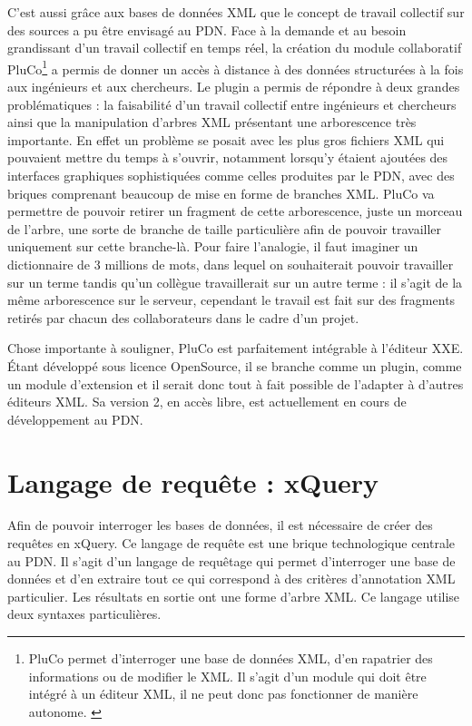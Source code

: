 \documentclass[a4paper,12pt,twoside]{book}
\begin{document}
    
    C'est aussi grâce aux bases de données \acrshort{XML} que le concept de travail collectif sur des sources a pu être envisagé au \acrshort{PDN}. Face à la demande et au besoin grandissant d'un travail collectif en temps réel, la création du module collaboratif PluCo\footnote{PluCo permet d'interroger une base de données XML, d'en rapatrier des informations ou de modifier le XML. Il s'agit d'un module qui doit être intégré à un éditeur XML, il ne peut donc pas fonctionner de manière autonome. \cite{pluco}} a permis de donner un accès à distance à des données structurées à la fois aux ingénieurs et aux chercheurs. Le plugin a permis de répondre à deux grandes problématiques : la faisabilité d'un travail collectif entre ingénieurs et chercheurs ainsi que la manipulation d'arbres \acrshort{XML} présentant une arborescence très importante. En effet un problème se posait avec les plus gros fichiers \acrshort{XML} qui pouvaient mettre du temps à s'ouvrir, notamment lorsqu'y étaient ajoutées des interfaces graphiques sophistiquées comme celles produites par le \acrshort{PDN}, avec des briques comprenant beaucoup de mise en forme de branches \acrshort{XML}. \acrshort{PluCo} va permettre de pouvoir retirer un fragment de cette arborescence, juste un morceau de l'arbre, une sorte de branche de taille particulière afin de pouvoir travailler uniquement sur cette branche-là. Pour faire l'analogie, il faut imaginer un dictionnaire de 3 millions de mots, dans lequel on souhaiterait pouvoir travailler sur un terme tandis qu'un collègue travaillerait sur un autre terme : il s'agit de la même arborescence sur le serveur, cependant le travail est fait sur des fragments retirés par chacun des collaborateurs dans le cadre d'un projet.
    
    Chose importante à souligner, \acrshort{PluCo} est parfaitement intégrable à l'éditeur \acrshort{XXE}. Étant développé sous licence OpenSource, il se branche comme un plugin, comme un module d'extension et il serait donc tout à fait possible de l'adapter à d'autres éditeurs \acrshort{XML}. Sa version 2, en accès libre, est actuellement en cours de développement au \acrshort{PDN}.
    
    \section{Langage de requête : xQuery}\label{que}
    Afin de pouvoir interroger les bases de données, il est nécessaire de créer des requêtes en xQuery. Ce langage de requête est une brique technologique centrale au \acrshort{PDN}. Il s'agit d'un langage de requêtage qui permet d'interroger une base de données et d'en extraire tout ce qui correspond à des critères d'annotation \acrshort{XML} particulier. Les résultats en sortie ont une forme d'arbre XML.
    Ce langage utilise deux syntaxes particulières.
    
\end{document}
